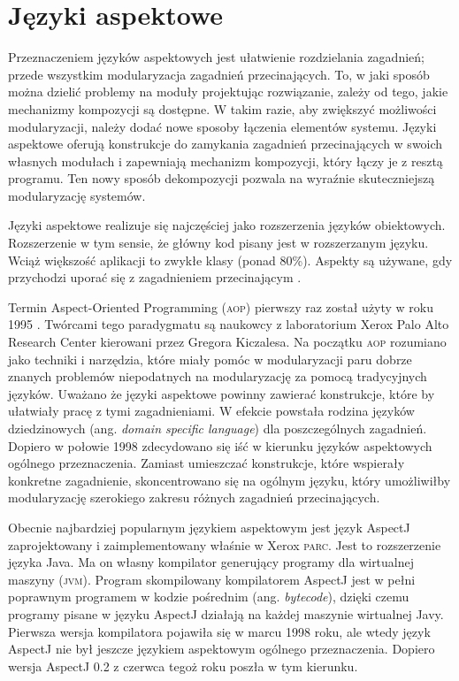 \documentclass[a4paper,12pt]{mwbk}
\begin{document}
\section{Języki aspektowe}

Przeznaczeniem języków aspektowych jest ułatwienie rozdzielania zagadnień;
przede wszystkim modularyzacja zagadnień przecinających.  To, w jaki sposób
można dzielić problemy na moduły projektując rozwiązanie, zależy od tego, jakie
mechanizmy kompozycji są dostępne.  W takim razie, aby zwiększyć możliwości
modularyzacji, należy dodać nowe sposoby łączenia elementów systemu.  Języki
aspektowe oferują konstrukcje do zamykania zagadnień przecinających w swoich
własnych modułach i zapewniają mechanizm kompozycji, który łączy je z resztą
programu. Ten nowy sposób dekompozycji pozwala na wyraźnie skuteczniejszą
modularyzację systemów.

Języki aspektowe realizuje się najczęściej jako rozszerzenia języków
obiektowych. Rozszerzenie w tym sensie, że główny kod pisany jest w
rozszerzanym języku. Wciąż większość aplikacji to zwykłe klasy (ponad 80\%).
Aspekty są używane, gdy przychodzi uporać się z zagadnieniem przecinającym .

Termin Aspect-Oriented Programming (\textsc{aop}) pierwszy raz został użyty w
roku 1995 \cite{hist}. Twórcami tego paradygmatu są naukowcy z laboratorium
Xerox Palo Alto Research Center kierowani przez Gregora Kiczalesa.  Na początku
\textsc{aop} rozumiano jako techniki i narzędzia, które miały pomóc w
modularyzacji paru dobrze znanych problemów niepodatnych na modularyzację za
pomocą tradycyjnych języków. Uważano że języki aspektowe powinny zawierać
konstrukcje, które by ułatwiały pracę z tymi zagadnieniami. W efekcie powstała
rodzina języków dziedzinowych (ang. \emph{domain specific language}) dla
poszczególnych zagadnień. Dopiero w połowie 1998 zdecydowano się iść w kierunku
języków aspektowych ogólnego przeznaczenia. Zamiast umieszczać konstrukcje,
które wspierały konkretne zagadnienie, skoncentrowano się na ogólnym języku,
który umożliwiłby modularyzację szerokiego zakresu różnych zagadnień
przecinających.
         
Obecnie najbardziej popularnym językiem aspektowym jest język AspectJ
\cite{AspectJ} zaprojektowany i zaimplementowany właśnie w Xerox \textsc{parc}.
Jest to rozszerzenie języka Java. Ma on własny kompilator generujący programy
dla wirtualnej maszyny (\textsc{jvm}).  Program skompilowany kompilatorem
AspectJ jest w pełni poprawnym programem w kodzie pośrednim (ang.
\emph{bytecode}), dzięki czemu programy pisane w języku AspectJ działają na
każdej maszynie wirtualnej Javy.  Pierwsza wersja kompilatora pojawiła się w
marcu 1998 roku, ale wtedy język AspectJ nie był jeszcze językiem aspektowym
ogólnego przeznaczenia. Dopiero wersja AspectJ 0.2 z czerwca tegoż roku poszła
w tym kierunku.
\end{document}

